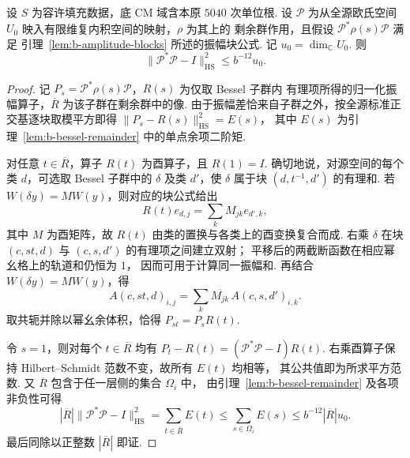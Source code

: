 \begin{lemma}
\label{lem:b-unit-moment}
\emitthmsource
设 $S$ 为容许填充数据，底 CM 域含本原 $5040$ 次单位根.
设 $\mathcal P$ 为从全源欧氏空间 $U_0$ 映入有限维复内积空间的映射，$\rho$ 为其上的
剩余群作用，且假设 $\mathcal P^*\rho(s)\mathcal P$ 满足
引理~\ref{lem:b-amplitude-blocks} 所述的振幅块公式.
记 $u_0=\dim_{\mathbb C}U_0$. 则
\[
 \|\mathcal P^*\mathcal P-I\|_{\mathrm{HS}}^2\le b^{-12}u_0 .
\]
\end{lemma}
\begin{proof}
记 $P_s=\mathcal P^*\rho(s)\mathcal P$，$R(s)$ 为仅取 Bessel 子群内
有理项所得的归一化振幅算子，$\overline R$ 为该子群在剩余群中的像.
由于振幅差恰来自子群之外，按全源标准正交基逐块取模平方即得
$\|P_s-R(s)\|_{\mathrm{HS}}^2=E(s)$，
其中 $E(s)$ 为引理~\ref{lem:b-bessel-remainder} 中的单点余项二阶矩.

对任意 $t\in\overline R$，算子 $R(t)$ 为酉算子，且 $R(1)=I$.
确切地说，对源空间的每个类 $d$，可选取 Bessel 子群中的 $\delta$
及类 $d'$，使 $\delta$ 属于块 $(d,t^{-1},d')$ 的有理和.
若 $W(\delta y)=MW(y)$，则对应的块公式给出
\[
 R(t)e_{d,j}=\sum_k M_{jk}e_{d',k},
\]
其中 $M$ 为酉矩阵，故 $R(t)$ 由类的置换与各类上的酉变换复合而成.
右乘 $\delta$ 在块 $(c,st,d)$ 与 $(c,s,d')$ 的有理项之间建立双射；
平移后的两截断函数在相应幂幺格上的轨道和仍恒为 $1$，
因而可用于计算同一振幅和. 再结合 $W(\delta y)=MW(y)$，得
\[
 A(c,st,d)_{i,j}
   =\sum_k \overline{M_{jk}}\, A(c,s,d')_{i,k}.
\]
取共轭并除以幂幺余体积，恰得 $P_{st}=P_s R(t)$.

令 $s=1$，则对每个 $t\in\overline R$ 均有
$P_t-R(t)=(\mathcal P^*\mathcal P-I)R(t)$.
右乘酉算子保持 Hilbert--Schmidt 范数不变，故所有 $E(t)$ 均相等，
其公共值即为所求平方范数.
又 $\overline R$ 包含于任一层侧的集合 $\Omega_i$ 中，
由引理~\ref{lem:b-bessel-remainder} 及各项非负性可得
\[
 |\overline R|\|\mathcal P^*\mathcal P-I\|_{\mathrm{HS}}^2
 =\sum_{t\in\overline R}E(t)
 \le\sum_{s\in\Omega_i}E(s)
 \le b^{-12}|\overline R|u_0 .
\]
最后同除以正整数 $|\overline R|$ 即证.
\end{proof}

